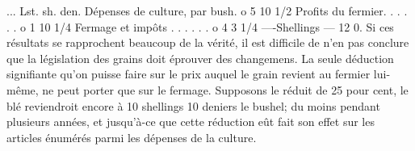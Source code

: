 ... Lst. sh. den.
Dépenses de culture, par bush. o 5 10 1/2
Profits du fermier. . . . . . o 1 10 1/4
Fermage et impôts . . . . . . o 4 3 1/4
----Shellings — 12 0.
Si ces résultats se rapprochent beaucoup de la vérité, il est difficile de n'en pas conclure que la législation des grains doit éprouver des changemens. La seule déduction signifiante qu'on puisse faire sur le prix auquel le grain revient au fermier lui-même, ne peut porter que sur le fermage. Supposons le réduit de 25 pour cent, le blé reviendroit encore à 10 shellings 10 deniers le bushel; du moins pendant plusieurs années, et jusqu'à-ce que cette réduction eût fait son effet sur les articles énumérés parmi les dépenses de la culture.